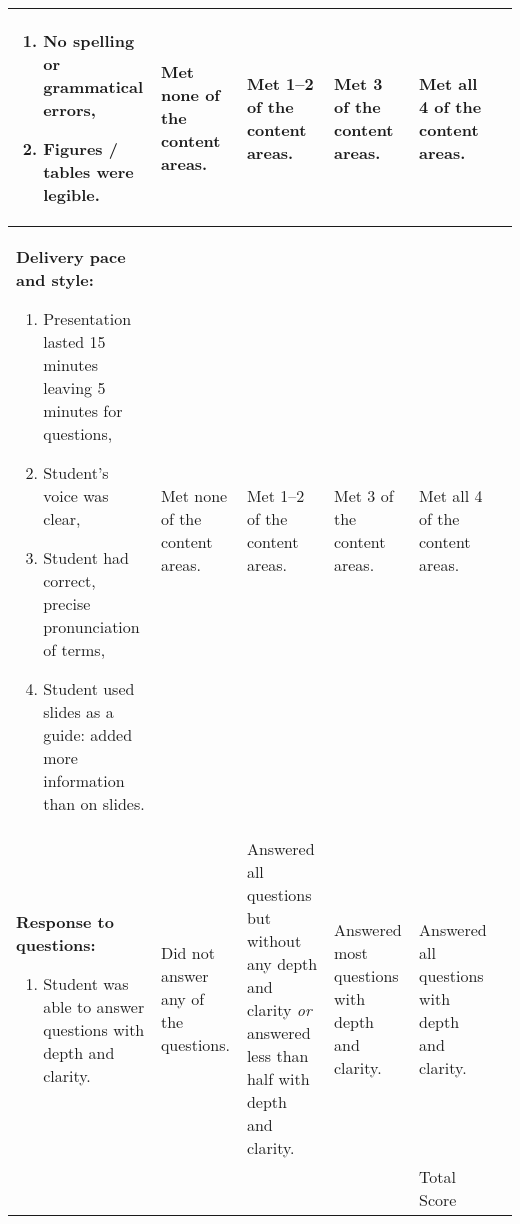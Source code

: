 \documentclass[10pt, twoside]{article}
\begin{document}
\begin{landscape}
{\begin{longtable}[l]{@{}L{5cm}L{3.5cm}L{3.5cm}L{3.5cm}L{3.5cm}L{1.9cm}@{}}
\begin{enumerate}[itemsep=-0.25\baselineskip,align=left, leftmargin=*]
\item No spelling or grammatical errors,\par%
\item Figures / tables were legible.\end{enumerate}&%
Met none of the content areas. &%
Met 1--2 of the content areas. &%
Met 3 of the content areas. &%
Met all 4 of the content areas.&%
\\[-1em]
\midrule
\textbf{Delivery pace and style:}\par%
\vspace{-0.5\baselineskip}
\begin{enumerate}[itemsep=-0.25\baselineskip,align=left, leftmargin=*]
\item Presentation lasted 15 minutes leaving 5 minutes for questions, \par%
\item Student’s voice was clear, \par%
\item Student had correct, precise pronunciation of terms,\par%
\item Student used slides as a guide: added more information than on slides.\end{enumerate}&%
Met none of the content areas. &%
Met 1--2 of the content areas. &%
Met 3 of the content areas. &%
Met all 4 of the content areas.&%
\\[-1em]
\midrule
\textbf{Response to questions:}\par%
\vspace{-0.5\baselineskip}
\begin{enumerate}[itemsep=-0.25\baselineskip,align=left, leftmargin=*]
\item Student was able to answer questions with depth and clarity.\end{enumerate}&%
Did not answer any of the questions. &%
Answered all questions but without any depth and clarity \emph{or} answered less than half with depth and clarity. &%
Answered most questions with depth and clarity. &%
Answered all questions with depth and clarity.&%
\\
\midrule
& & & & \vspace{0.5in}\par\hfill\normalsize{Total Score\phantom{m}} & \\
\bottomrule
\end{longtable}
}%

\end{landscape}
\end{document}

